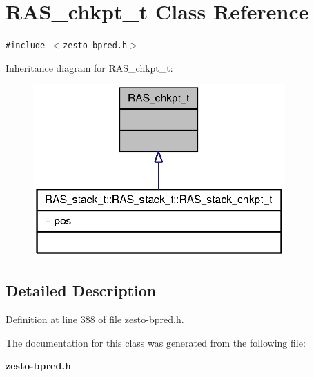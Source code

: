 \section{RAS\_\-chkpt\_\-t Class Reference}
\label{classRAS__chkpt__t}
{\tt \#include $<$zesto-bpred.h$>$}

Inheritance diagram for RAS\_\-chkpt\_\-t:\nopagebreak
\begin{figure}[H]
\begin{center}
\leavevmode
\includegraphics[width=274pt]{classRAS__chkpt__t__inherit__graph}
\end{center}
\end{figure}


\subsection{Detailed Description}


Definition at line 388 of file zesto-bpred.h.

The documentation for this class was generated from the following file:\begin{CompactItemize}
\item 
{\bf zesto-bpred.h}\end{CompactItemize}
